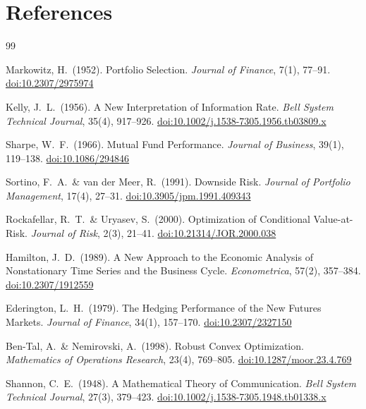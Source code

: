 \documentclass[12pt,openany]{book}
\numberwithin{equation}{chapter}
\theoremstyle{plain}
\theoremstyle{definition}
\theoremstyle{remark}
\numberwithin{equation}{chapter}
\theoremstyle{plain}
\begin{document}
\chapter*{References}

\begin{thebibliography}{99}

Markowitz, H.\ (1952).
Portfolio Selection.
\textit{Journal of Finance}, 7(1), 77--91.
\href{https://doi.org/10.2307/2975974}{doi:10.2307/2975974}

Kelly, J.\ L.\ (1956).
A New Interpretation of Information Rate.
\textit{Bell System Technical Journal}, 35(4), 917--926.
\href{https://doi.org/10.1002/j.1538-7305.1956.tb03809.x}{doi:10.1002/j.1538-7305.1956.tb03809.x}

Sharpe, W.\ F.\ (1966).
Mutual Fund Performance.
\textit{Journal of Business}, 39(1), 119--138.
\href{https://doi.org/10.1086/294846}{doi:10.1086/294846}

Sortino, F.\ A.\ \& van der Meer, R.\ (1991).
Downside Risk.
\textit{Journal of Portfolio Management}, 17(4), 27--31.
\href{https://doi.org/10.3905/jpm.1991.409343}{doi:10.3905/jpm.1991.409343}

Rockafellar, R.\ T.\ \& Uryasev, S.\ (2000).
Optimization of Conditional Value-at-Risk.
\textit{Journal of Risk}, 2(3), 21--41.
\href{https://doi.org/10.21314/JOR.2000.038}{doi:10.21314/JOR.2000.038}

Hamilton, J.\ D.\ (1989).
A New Approach to the Economic Analysis of Nonstationary Time Series
and the Business Cycle.
\textit{Econometrica}, 57(2), 357--384.
\href{https://doi.org/10.2307/1912559}{doi:10.2307/1912559}

Ederington, L.\ H.\ (1979).
The Hedging Performance of the New Futures Markets.
\textit{Journal of Finance}, 34(1), 157--170.
\href{https://doi.org/10.2307/2327150}{doi:10.2307/2327150}

Ben-Tal, A.\ \& Nemirovski, A.\ (1998).
Robust Convex Optimization.
\textit{Mathematics of Operations Research}, 23(4), 769--805.
\href{https://doi.org/10.1287/moor.23.4.769}{doi:10.1287/moor.23.4.769}

Shannon, C.\ E.\ (1948).
A Mathematical Theory of Communication.
\textit{Bell System Technical Journal}, 27(3), 379--423.
\href{https://doi.org/10.1002/j.1538-7305.1948.tb01338.x}{doi:10.1002/j.1538-7305.1948.tb01338.x}


\end{thebibliography}
\end{document}
